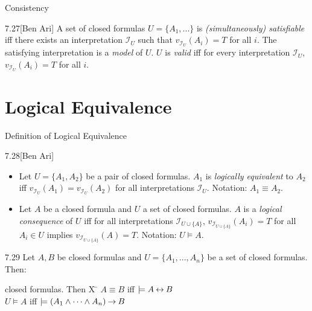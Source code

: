 \documentclass[style=sailor,size=12pt]{powerdot}
\begin{document}
\begin{wideslide}[bm=,toc=]{Consistency}
\begin{defn}{7.27}[Ben Ari]
A set of closed formulas $U = \{A_1,...\}$ is \emph{(simultaneously)
  satisfiable} iff there exists an interpretation $\mathcal{I}_U$ such that
  $v_{\mathcal{I}_U}(A_i) = T$ for all $i$. The satisfying interpretation
  is a \emph{model} of $U$. $U$ is \emph{valid} iff for every interpretation
  $\mathcal{I}_U$, $v_{\mathcal{I}_U}(A_i) = T$ for all $i$.
\end{defn}

\end{wideslide}

\section[slide=true]{Logical Equivalence}

\begin{wideslide}[bm=,toc=]{Definition of Logical Equivalence}
\begin{defn}{7.28}[Ben Ari]
\end{defn}
\vspace{-2ex}
\begin{itemize}
\item Let $U = \{A_1,A_2\}$ be a pair of closed formulas. $A_1$ is
\emph{logically equivalent} to $A_2$ iff $v_{{\mathcal{I}_U}}(A_1) =
v_{{\mathcal{I}_U}}(A_2)$ for all interpretations $\mathcal{I}_U$.
Notation: $A_1 \equiv A_2$.
\item Let $A$ be a closed formula and $U$ a set of closed formulas.
$A$ is a \emph{logical consequence} of $U$ iff for all interpretations
$\mathcal{I}_{U \cup \{A\}}$, $v_{\mathcal{I}_{U \cup \{A\}}}(A_i) = T$ for
all $A_i \in U$ implies $v_{\mathcal{I}_{U \cup \{A\}}}(A) = T$. Notation: $U \models A$.
\end{itemize}
\begin{thm}{7.29}
Let $A,B$ be closed formulas and $U = \{A_1,...,A_n\}$ be a set of
closed formulas. Then:
\end{thm}
\vspace{-5ex}
\begin{tabbing}
closed formulas. Then X \= \kill
\> $A \equiv B$ iff $\models A \mathbin{\leftrightarrow} B$\\
\> $U \models A$ iff $\models (A_1 \land \cdots \land A_n) \mathbin{\rightarrow} B$
\end{tabbing}

\end{wideslide}
\end{document}
